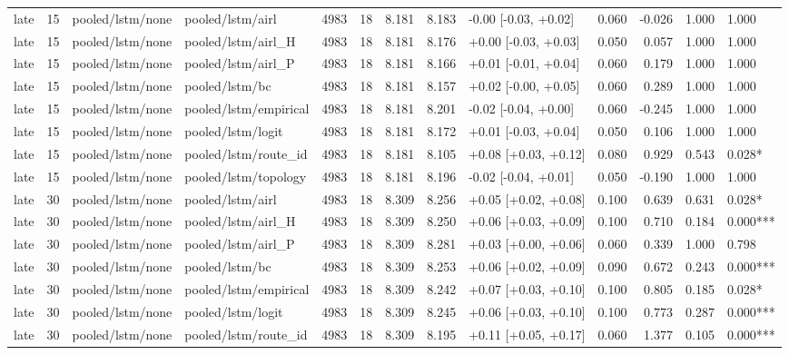 \begin{tabular}{lrllrrrrlrrll}
late & 15 & pooled/lstm/none & pooled/lstm/airl & 4983 & 18 & 8.181 & 8.183 & -0.00 [-0.03, +0.02] & 0.060 & -0.026 & 1.000 & 1.000 \\
late & 15 & pooled/lstm/none & pooled/lstm/airl_H & 4983 & 18 & 8.181 & 8.176 & +0.00 [-0.03, +0.03] & 0.050 & 0.057 & 1.000 & 1.000 \\
late & 15 & pooled/lstm/none & pooled/lstm/airl_P & 4983 & 18 & 8.181 & 8.166 & +0.01 [-0.01, +0.04] & 0.060 & 0.179 & 1.000 & 1.000 \\
late & 15 & pooled/lstm/none & pooled/lstm/bc & 4983 & 18 & 8.181 & 8.157 & +0.02 [-0.00, +0.05] & 0.060 & 0.289 & 1.000 & 1.000 \\
late & 15 & pooled/lstm/none & pooled/lstm/empirical & 4983 & 18 & 8.181 & 8.201 & -0.02 [-0.04, +0.00] & 0.060 & -0.245 & 1.000 & 1.000 \\
late & 15 & pooled/lstm/none & pooled/lstm/logit & 4983 & 18 & 8.181 & 8.172 & +0.01 [-0.03, +0.04] & 0.050 & 0.106 & 1.000 & 1.000 \\
late & 15 & pooled/lstm/none & pooled/lstm/route_id & 4983 & 18 & 8.181 & 8.105 & +0.08 [+0.03, +0.12] & 0.080 & 0.929 & 0.543 & 0.028* \\
late & 15 & pooled/lstm/none & pooled/lstm/topology & 4983 & 18 & 8.181 & 8.196 & -0.02 [-0.04, +0.01] & 0.050 & -0.190 & 1.000 & 1.000 \\
late & 30 & pooled/lstm/none & pooled/lstm/airl & 4983 & 18 & 8.309 & 8.256 & +0.05 [+0.02, +0.08] & 0.100 & 0.639 & 0.631 & 0.028* \\
late & 30 & pooled/lstm/none & pooled/lstm/airl_H & 4983 & 18 & 8.309 & 8.250 & +0.06 [+0.03, +0.09] & 0.100 & 0.710 & 0.184 & 0.000*** \\
late & 30 & pooled/lstm/none & pooled/lstm/airl_P & 4983 & 18 & 8.309 & 8.281 & +0.03 [+0.00, +0.06] & 0.060 & 0.339 & 1.000 & 0.798 \\
late & 30 & pooled/lstm/none & pooled/lstm/bc & 4983 & 18 & 8.309 & 8.253 & +0.06 [+0.02, +0.09] & 0.090 & 0.672 & 0.243 & 0.000*** \\
late & 30 & pooled/lstm/none & pooled/lstm/empirical & 4983 & 18 & 8.309 & 8.242 & +0.07 [+0.03, +0.10] & 0.100 & 0.805 & 0.185 & 0.028* \\
late & 30 & pooled/lstm/none & pooled/lstm/logit & 4983 & 18 & 8.309 & 8.245 & +0.06 [+0.03, +0.10] & 0.100 & 0.773 & 0.287 & 0.000*** \\
late & 30 & pooled/lstm/none & pooled/lstm/route_id & 4983 & 18 & 8.309 & 8.195 & +0.11 [+0.05, +0.17] & 0.060 & 1.377 & 0.105 & 0.000*** \\

\end{tabular}
